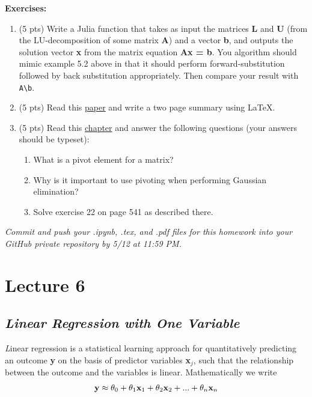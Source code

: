 \documentclass[11pt,a4paper,oneside]{report}
\begin{document}
{\bf Exercises: }\\

\begin{enumerate}
\item (5 pts) Write a Julia function that takes as input the matrices {\bf L}  and {\bf U} (from the LU-decomposition of some matrix {\bf A}) and a vector {\bf b}, and outputs the solution vector {\bf x} from the matrix equation {\bf Ax = b}. You algorithm should mimic example 5.2 above in that it should perform forward-substitution followed by back substitution appropriately. Then compare your result with \verb+A\b+.
\item (5 pts) Read this \href{http://www.ams.org/notices/201106/rtx110600782p.pdf}{paper} and write a two page summary using \LaTeX.
\item (5 pts) Read this \href{http://college.cengage.com/mathematics/larson/elementary_linear/4e/shared/downloads/c10s1.pdf}{chapter} and answer the following questions (your answers should be typeset):
\begin{enumerate}
\item What is a pivot element for a matrix?
\item Why is it important to use pivoting when performing Gaussian elimination?
\item Solve exercise 22 on page 541 as described there.\\
\end{enumerate}
\end{enumerate}

{\it Commit and push your .ipynb, .tex, and .pdf files for this homework into your GitHub private repository by 5/12 at 11:59 PM.}

\newpage
\section*{Lecture 6}

{\center\color{magenta}
\subsection*{\it\huge Linear Regression with One Variable}}

{\it\huge L}inear regression is a statistical learning approach for quantitatively predicting an outcome {\bf y} on the basis of predictor variables {\bf x}$_j$, such that the relationship between the outcome and the variables is linear. Mathematically we write
\[
\textnormal{{\bf y}} \approx  \theta_0 +
\theta_1 \textnormal{{\bf x}}_1 +
\theta_2 \textnormal{{\bf x}}_2 + ... +
\theta_n \textnormal{{\bf x}}_n
\]
\end{document}
